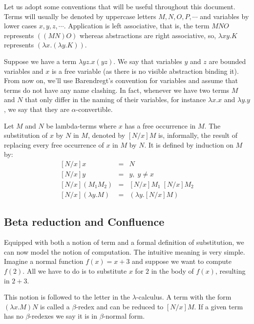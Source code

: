 Let us adopt some conventions that will be useful throughout this document. Terms will usually be denoted by uppercase letters $M, N, O, P, \cdots$ and variables by lower cases $x, y, z, \cdots$.
Application is left associative, that is, the term $M N O$ represents $((M N) O)$ whereas
abstractions are right associative, so, $\lambda x y. K$ represents $(\lambda x . (\lambda y.K))$.

Suppose we have a term $\lambda yz.x(yz)$. We say that variables $y$ and $z$ are bounded variables
and $x$ is a free variable (as there is no visible abstraction binding it). From now on, we'll 
use Barendregt's convention for variables and assume that terms do not have any name clashing.
In fact, whenever we have two terms $M$ and $N$ that only differ in the naming of their variables,
for instance $\lambda x . x$ and $\lambda y . y$, we say that they are $\alpha$-convertible.\\

\begin{mydef}[Substitution] Let $M$ and $N$ be lambda-terms where $x$ has a free occurrence
in $M$. The substitution of $x$ by $N$ in $M$, denoted by $[N/x]M$ is, informally, the result
of replacing every free occurrence of $x$ in $M$ by $N$. It is defined by induction on $M$ by:
\begin{eqnarray*}
   {[N/x]} x & = & N \\
   {[N/x]} y & = & y, \; y \neq x \\
   {[N/x]}(M_1 M_2) & = & {[N/x]M_1\; [N/x]M_2} \\
   {[N/x]}(\lambda y . M) & = & (\lambda y . {[N/x]M})
\end{eqnarray*}
\end{mydef}

\subsection{Beta reduction and Confluence}

Equipped with both a notion of term and a formal definition of substitution, we can now
model the notion of computation. The intuitive meaning is very simple. Imagine a normal
function $f(x) = x + 3$ and suppose we want to compute $f(2)$. All we have to do is to
substitute $x$ for $2$ in the body of $f(x)$, resulting in $2+3$.

This notion is followed to the letter in the $\lambda$-calculus. A term with the form $(\lambda x . M)N$ is
called a $\beta$-redex and can be reduced to $[N/x]M$. If a given term has no $\beta$-redexes we say
it is in $\beta$-normal form.

